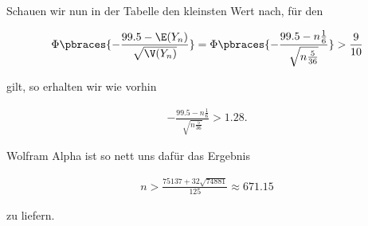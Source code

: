 \begin{solution}
Schauen wir nun in der Tabelle den kleinsten Wert nach, für den

\begin{align*}
    \Phi\pbraces{-\frac{99.5-\E(Y_n)}{\sqrt{\V(Y_n)}}} = \Phi\pbraces{-\frac{99.5-n\frac{1}{6}}{\sqrt{n\frac{5}{36}}}} > \frac{9}{10}
\end{align*}

gilt, so erhalten wir wie vorhin

\begin{align*}
    -\frac{99.5-n\frac{1}{6}}{\sqrt{n\frac{5}{36}}} > 1.28.
\end{align*}

Wolfram Alpha ist so nett uns dafür das Ergebnis

\begin{align*}
    n > \frac{75137 + 32\sqrt{74881}}{125} \approx 671.15
\end{align*}

zu liefern.

\end{solution}

